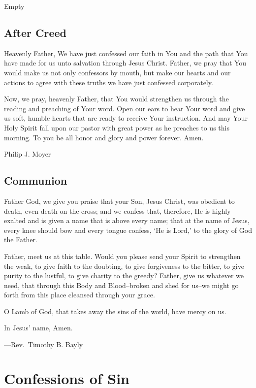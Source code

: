 \documentclass[]{book}
\begin{document}
Empty

\section{After Creed}\label{after-creed}

Heavenly Father, We have just confessed our faith in You and the path
that You have made for us unto salvation through Jesus Christ. Father,
we pray that You would make us not only confessors by mouth, but make
our hearts and our actions to agree with these truths we have just
confessed corporately.

Now, we pray, heavenly Father, that You would strengthen us through the
reading and preaching of Your word. Open our ears to hear Your word and
give us soft, humble hearts that are ready to receive Your instruction.
And may Your Holy Spirit fall upon our pastor with great power as he
preaches to us this morning. To you be all honor and glory and power
forever. Amen.

Philip J. Moyer

\section{Communion}\label{communion}

Father God, we give you praise that your Son, Jesus Christ, was obedient
to death, even death on the cross; and we confess that, therefore, He is
highly exalted and is given a name that is above every name; that at the
name of Jesus, every knee should bow and every tongue confess, `He is
Lord,' to the glory of God the Father.

Father, meet us at this table. Would you please send your Spirit to
strengthen the weak, to give faith to the doubting, to give forgiveness
to the bitter, to give purity to the lustful, to give charity to the
greedy? Father, give us whatever we need, that through this Body and
Blood--broken and shed for us--we might go forth from this place
cleansed through your grace.

O Lamb of God, that takes away the sins of the world, have mercy on us.

In Jesus' name, Amen.

---Rev.~Timothy B. Bayly

\chapter{Confessions of Sin}\label{confessions-of-sin}
\end{document}
